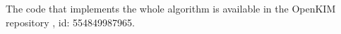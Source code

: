 \documentclass[%
 reprint,
 amsmath,amssymb,
 aps,
]{revtex4-1}
\begin{document}
The code that implements the whole algorithm is available in the OpenKIM repository \cite{openkim2016}, id: 554849987965.
%
%
%
%
%
\end{document}
